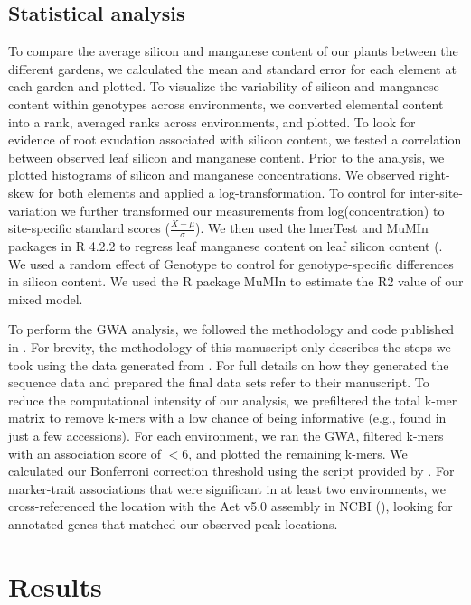 \documentclass[12pt, letterpaper]{report}
\begin{document}
\subsection{Statistical analysis}

To compare the average silicon and manganese content of our plants between the different gardens, we calculated the mean and standard error for each element at each garden and plotted. To visualize the variability of silicon and manganese content within genotypes across environments, we converted elemental content into a rank, averaged ranks across environments, and plotted. To look for evidence of root exudation associated with silicon content, we tested a correlation between observed leaf silicon and manganese content. Prior to the analysis, we plotted histograms of silicon and manganese concentrations. We observed right-skew for both elements and applied a log-transformation. To control for inter-site-variation we further transformed our measurements from log(concentration) to site-specific standard scores ($\frac{X-\mu}{\sigma}$). We then used the lmerTest and MuMIn packages in R 4.2.2 to regress leaf manganese content on leaf silicon content (\cite{barton_2023_mumin,kuznetsova_2017_lmerTest,r_core_team_2022}. We used a random effect of Genotype to control for genotype-specific differences in silicon content. We used the R package MuMIn to estimate the R2 value of our mixed model.

To perform the GWA analysis, we followed the methodology and code published in \textcite{gaurav_population_2021}. For brevity, the methodology of this manuscript only describes the steps we took using the data generated from \textcite{gaurav_population_2021}. For full details on how they generated the sequence data and prepared the final data sets refer to their manuscript. To reduce the computational intensity of our analysis, we prefiltered the total k-mer matrix to remove k-mers with a low chance of being informative (e.g., found in just a few accessions). For each environment, we ran the GWA, filtered k-mers with an association score of $<6$, and plotted the remaining k-mers. We calculated our Bonferroni correction threshold using the script provided by \textcite{gaurav_population_2021}. For marker-trait associations that were significant in at least two environments, we cross-referenced the location with the Aet v5.0 assembly in NCBI (\cite{wang_aegilops_2021}), looking for annotated genes that matched our observed peak locations. 

\section{Results}
\end{document}
